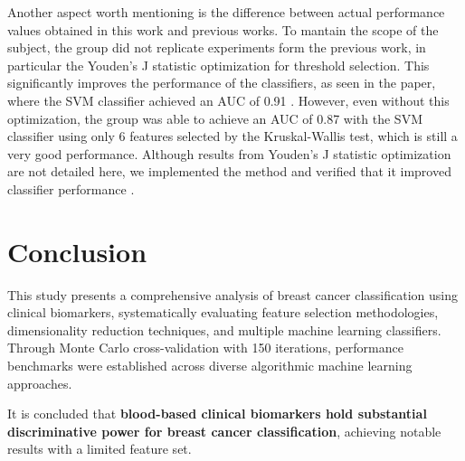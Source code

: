 \documentclass[12pt,a4paper]{article}
\begin{document}
Another aspect worth mentioning is the difference between actual performance values obtained in this work and previous works. To mantain the scope of the subject, the group did not replicate experiments form the previous work, in particular the Youden's J statistic optimization for threshold selection. This significantly improves the performance of the classifiers, as seen in the paper, where the SVM classifier achieved an AUC of 0.91 \cite{patricio2018using}. However, even without this optimization, the group was able to achieve an AUC of 0.87 with the SVM classifier using only 6 features selected by the Kruskal-Wallis test, which is still a very good performance. Although results from Youden's J statistic optimization are not detailed here, we implemented the method and verified that it improved classifier performance \cite{youden1950index}.

\section{Conclusion}
\label{sec:conclusion}

This study presents a comprehensive analysis of breast cancer classification using clinical biomarkers, systematically evaluating feature selection methodologies, dimensionality reduction techniques, and multiple machine learning classifiers. Through Monte Carlo cross-validation with 150 iterations, performance benchmarks were established across diverse algorithmic machine learning approaches.

It is concluded that \textbf{blood-based clinical biomarkers hold substantial discriminative power for breast cancer classification}, achieving notable results with a limited feature set. 



\end{document}

